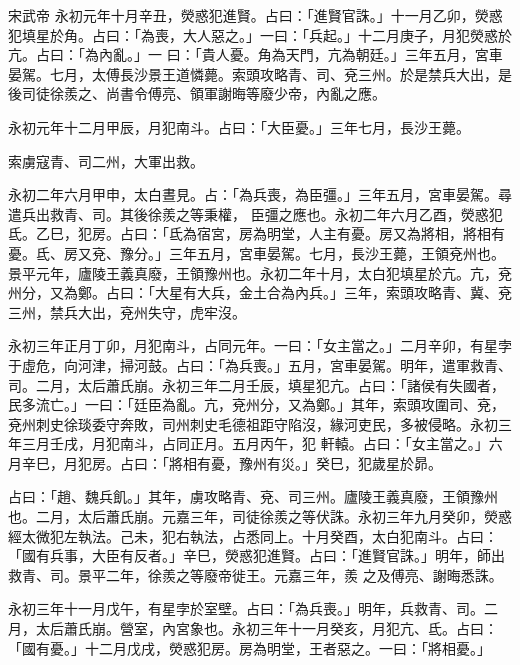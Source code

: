 
\begin{pinyinscope}

 宋武帝
 永初元年十月辛丑，熒惑犯進賢。占曰：「進賢官誅。」十一月乙卯，熒惑犯填星於角。占曰：「為喪，大人惡之。」一曰：「兵起。」十二月庚子，月犯熒惑於亢。占曰：「為內亂。」一
 曰：「貴人憂。角為天門，亢為朝廷。」三年五月，宮車晏駕。七月，太傅長沙景王道憐薨。索頭攻略青、司、兗三州。於是禁兵大出，是後司徒徐羨之、尚書令傅亮、領軍謝晦等廢少帝，內亂之應。



 永初元年十二月甲辰，月犯南斗。占曰：「大臣憂。」三年七月，長沙王薨。



 索虜寇青、司二州，大軍出救。



 永初二年六月甲申，太白晝見。占：「為兵喪，為臣彊。」三年五月，宮車晏駕。尋遣兵出救青、司。其後徐羨之等秉權，
 臣彊之應也。永初二年六月乙酉，熒惑犯氐。乙巳，犯房。占曰：「氐為宿宮，房為明堂，人主有憂。房又為將相，將相有憂。氐、房又兗、豫分。」三年五月，宮車晏駕。七月，長沙王薨，王領兗州也。景平元年，廬陵王義真廢，王領豫州也。永初二年十月，太白犯填星於亢。亢，兗州分，又為鄭。占曰：「大星有大兵，金土合為內兵。」三年，索頭攻略青、冀、兗三州，禁兵大出，兗州失守，虎牢沒。



 永初三年正月丁卯，月犯南斗，占同元年。一曰：「女主當之。」二月辛卯，有星孛于虛危，向河津，掃河鼓。占曰：「為兵喪。」五月，宮車晏駕。明年，遣軍救青、司。二月，太后蕭氏崩。永初三年二月壬辰，填星犯亢。占曰：「諸侯有失國者，民多流亡。」一曰：「廷臣為亂。亢，兗州分，又為鄭。」其年，索頭攻圍司、兗，兗州刺史徐琰委守奔敗，司州刺史毛德祖距守陷沒，緣河吏民，多被侵略。永初三年三月壬戌，月犯南斗，占同正月。五月丙午，犯
 軒轅。占曰：「女主當之。」六月辛巳，月犯房。占曰：「將相有憂，豫州有災。」癸巳，犯歲星於昴。



 占曰：「趙、魏兵飢。」其年，虜攻略青、兗、司三州。廬陵王義真廢，王領豫州也。二月，太后蕭氏崩。元嘉三年，司徒徐羨之等伏誅。永初三年九月癸卯，熒惑經太微犯左執法。己未，犯右執法，占悉同上。十月癸酉，太白犯南斗。占曰：「國有兵事，大臣有反者。」辛巳，熒惑犯進賢。占曰：「進賢官誅。」明年，師出救青、司。景平二年，徐羨之等廢帝徙王。元嘉三年，羨
 之及傅亮、謝晦悉誅。



 永初三年十一月戊午，有星孛於室壁。占曰：「為兵喪。」明年，兵救青、司。二月，太后蕭氏崩。營室，內宮象也。永初三年十一月癸亥，月犯亢、氐。占曰：「國有憂。」十二月戊戌，熒惑犯房。房為明堂，王者惡之。一曰：「將相憂。」




\end{pinyinscope}
